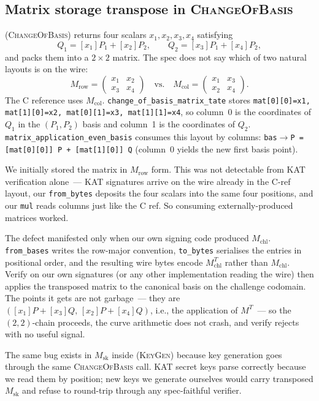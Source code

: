 \subsection{Matrix storage transpose in \textsc{ChangeOfBasis}}
\label{sec:matrix-transpose}

 (\textsc{ChangeOfBasis}) returns four scalars
$x_1, x_2, x_3, x_4$ satisfying
\[
Q_1 = [x_1] P_1 + [x_2] P_2, \qquad Q_2 = [x_3] P_1 + [x_4] P_2,
\]
and packs them into a $2 \times 2$ matrix.  The spec does not say
which of two natural layouts is on the wire:
\[
M_{\mathrm{row}} = \begin{pmatrix} x_1 & x_2 \\ x_3 & x_4 \end{pmatrix}
\quad\text{vs.}\quad
M_{\mathrm{col}} = \begin{pmatrix} x_1 & x_3 \\ x_2 & x_4 \end{pmatrix}.
\]
The C reference uses $M_{\mathrm{col}}$.
\texttt{change\_of\_basis\_matrix\_tate} stores
\texttt{mat[0][0]=x1, mat[1][0]=x2, mat[0][1]=x3, mat[1][1]=x4}, so
column~0 is the coordinates of $Q_1$ in the $(P_1, P_2)$ basis and
column~1 is the coordinates of $Q_2$.
\texttt{matrix\_application\_even\_basis} consumes this layout by
columns:
\texttt{bas$\rightarrow$P = [mat[0][0]] P + [mat[1][0]] Q}
(column~0 yields the new first basis point).

We initially stored the matrix in $M_{\mathrm{row}}$ form.  This was
not detectable from KAT verification alone~--- KAT signatures arrive
on the wire already in the C-ref layout, our \texttt{from\_bytes}
deposits the four scalars into the same four positions, and our
\texttt{mul} reads columns just like the C ref.  So consuming
externally-produced matrices worked.

The defect manifested only when our own signing code produced
$M_{\mathrm{chl}}$.  \texttt{from\_bases} writes the row-major
convention, \texttt{to\_bytes} serialises the entries in
positional order, and the resulting wire bytes encode
$M_{\mathrm{chl}}^T$ rather than $M_{\mathrm{chl}}$.  Verify on our
own signatures (or any other implementation reading the wire) then
applies the transposed matrix to the canonical basis on the
challenge codomain.  The points it gets are not garbage~--- they are
$([x_1] P + [x_3] Q,\, [x_2] P + [x_4] Q)$, i.e., the application of
$M^T$~--- so the $(2,2)$-chain proceeds, the curve arithmetic does
not crash, and verify rejects with no useful signal.

The same bug exists in $M_{\mathrm{sk}}$ inside 
(\textsc{KeyGen}) because key generation goes through the same
\textsc{ChangeOfBasis} call.  KAT secret keys parse correctly
because we read them by position; new keys we generate ourselves
would carry transposed $M_{\mathrm{sk}}$ and refuse to round-trip
through any spec-faithful verifier.

